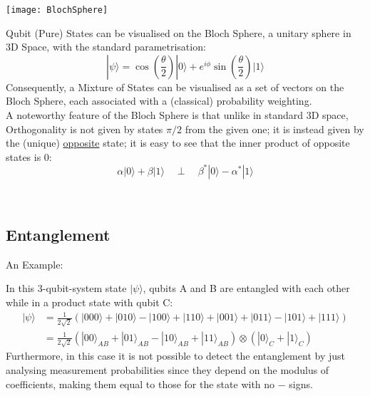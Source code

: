 \begin{minipage}{0.5\textwidth} \centering
    \texttt{[image: BlochSphere]}
    \label{fig:BlochSphere}
\end{minipage}
\begin{minipage}{0.5\textwidth}

Qubit (Pure) States can be visualised on the Bloch Sphere, a unitary sphere in 3D Space, with the standard parametrisation:
$$
    |\psi\rangle = \cos\left(\frac{\theta}{2}\right) |0\rangle + e^{i\phi} \sin\left(\frac{\theta}{2}\right) |1\rangle
$$
Consequently, a Mixture of States can be visualised as a set of vectors on the Bloch Sphere, each associated with a (classical)
probability weighting.\\

A noteworthy feature of the Bloch Sphere is that unlike in standard 3D space, Orthogonality is not given by states $\pi/2$ from
the given one; it is instead given by the (unique) \underline{opposite} state;
it is easy to see that the inner product of opposite states is 0:
\begin{equation}\label{eq:OrthState}
    \alpha |0\rangle + \beta |1\rangle \quad \perp \quad \beta^{*} |0\rangle - \alpha^{*} |1\rangle
\end{equation}

\end{minipage}\\[0.5cm]



\subsection{Entanglement}
\label{sec:SubEntanglement}

An Example:

\begin{exmp}\label{ex:Entanglement}
    In this 3-qubit-system state $|\psi\rangle$, qubits A and B are entangled with each other while in a product state with qubit C:
    \begin{align*}
        |\psi\rangle & = \frac{1}{2\sqrt{2}} (|000\rangle + |010\rangle - |100\rangle + |110\rangle + |001\rangle + |011\rangle - |101\rangle + |111\rangle) \\
                    & = \frac{1}{2\sqrt{2}} (|00\rangle_{AB} + |01\rangle_{AB} - |10\rangle_{AB} + |11\rangle_{AB}) \otimes (|0\rangle_{C} + |1\rangle_{C})
    \end{align*}
    Furthermore, in this case it is not possible to detect the entanglement by just analysing measurement probabilities since they depend on the
    modulus of coefficients, making them equal to those for the state with no $-$ signs.
\end{exmp}


